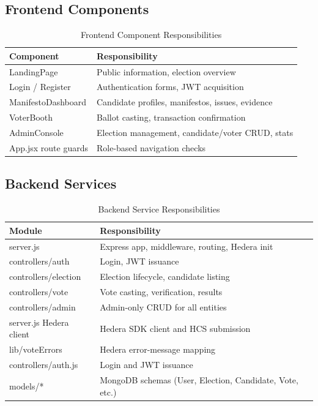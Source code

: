 \subsection{Frontend Components}
\label{sec:frontend-components}

\begin{table}[H]
\centering
\caption{Frontend Component Responsibilities}
\label{tab:frontend-components}
\begin{tabular}{@{}ll@{}}
\toprule
\textbf{Component} & \textbf{Responsibility} \\
\midrule
LandingPage & Public information, election overview \\
Login / Register & Authentication forms, JWT acquisition \\
ManifestoDashboard & Candidate profiles, manifestos, issues, evidence \\
VoterBooth & Ballot casting, transaction confirmation \\
AdminConsole & Election management, candidate/voter CRUD, stats \\
App.jsx route guards & Role-based navigation checks \\
\midrule
\end{tabular}
\end{table}

\subsection{Backend Services}
\label{sec:backend-services}

\begin{table}[H]
\centering
\caption{Backend Service Responsibilities}
\label{tab:backend-services}
\begin{tabular}{@{}ll@{}}
\toprule
\textbf{Module} & \textbf{Responsibility} \\
\midrule
server.js & Express app, middleware, routing, Hedera init \\
controllers/auth & Login, JWT issuance \\
controllers/election & Election lifecycle, candidate listing \\
controllers/vote & Vote casting, verification, results \\
controllers/admin & Admin-only CRUD for all entities \\
server.js Hedera client & Hedera SDK client and HCS submission \\
lib/voteErrors & Hedera error-message mapping \\
controllers/auth.js & Login and JWT issuance \\
models/* & MongoDB schemas (User, Election, Candidate, Vote, etc.) \\
\midrule
\end{tabular}
\end{table}

